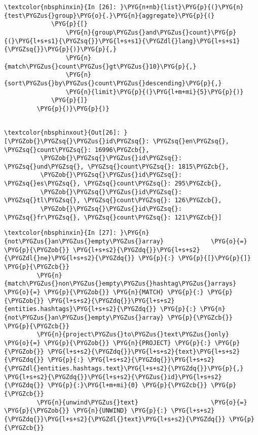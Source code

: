 \documentclass[letterpaper,10pt,english]{sphinxmanual}
\begin{document}
%
\begin{Verbatim}[commandchars=\\\{\}]
\textcolor{nbsphinxin}{In [26]: }\PYG{n+nb}{list}\PYG{p}{(}\PYG{n}{test\PYGZus{}group}\PYG{o}{.}\PYG{n}{aggregate}\PYG{p}{(}
             \PYG{p}{[}
                 \PYG{n}{group\PYGZus{}and\PYGZus{}count}\PYG{p}{(}\PYG{l+s+s1}{\PYGZsq{}}\PYG{l+s+s1}{\PYGZdl{}lang}\PYG{l+s+s1}{\PYGZsq{}}\PYG{p}{)}\PYG{p}{,}
                 \PYG{n}{match\PYGZus{}count\PYGZus{}gt\PYGZus{}10}\PYG{p}{,}
                 \PYG{n}{sort\PYGZus{}by\PYGZus{}count\PYGZus{}descending}\PYG{p}{,}
                 \PYG{n}{limit}\PYG{p}{(}\PYG{l+m+mi}{5}\PYG{p}{)}
             \PYG{p}{]}
         \PYG{p}{)}\PYG{p}{)}
         
\end{Verbatim}

%
\begin{Verbatim}[commandchars=\\\{\}]
\textcolor{nbsphinxout}{Out[26]: }[\PYGZob{}\PYGZsq{}\PYGZus{}id\PYGZsq{}: \PYGZsq{}en\PYGZsq{}, \PYGZsq{}count\PYGZsq{}: 16996\PYGZcb{},
          \PYGZob{}\PYGZsq{}\PYGZus{}id\PYGZsq{}: \PYGZsq{}und\PYGZsq{}, \PYGZsq{}count\PYGZsq{}: 1815\PYGZcb{},
          \PYGZob{}\PYGZsq{}\PYGZus{}id\PYGZsq{}: \PYGZsq{}es\PYGZsq{}, \PYGZsq{}count\PYGZsq{}: 295\PYGZcb{},
          \PYGZob{}\PYGZsq{}\PYGZus{}id\PYGZsq{}: \PYGZsq{}tl\PYGZsq{}, \PYGZsq{}count\PYGZsq{}: 126\PYGZcb{},
          \PYGZob{}\PYGZsq{}\PYGZus{}id\PYGZsq{}: \PYGZsq{}fr\PYGZsq{}, \PYGZsq{}count\PYGZsq{}: 121\PYGZcb{}]
\end{Verbatim}

%
\begin{Verbatim}[commandchars=\\\{\}]
\textcolor{nbsphinxin}{In [27]: }\PYG{n}{not\PYGZus{}an\PYGZus{}empty\PYGZus{}array}             \PYG{o}{=} \PYG{p}{\PYGZob{}} \PYG{l+s+s2}{\PYGZdq{}}\PYG{l+s+s2}{\PYGZdl{}ne}\PYG{l+s+s2}{\PYGZdq{}} \PYG{p}{:} \PYG{p}{[}\PYG{p}{]} \PYG{p}{\PYGZcb{}}
         \PYG{n}{match\PYGZus{}non\PYGZus{}empty\PYGZus{}hashtag\PYGZus{}arrays} \PYG{o}{=} \PYG{p}{\PYGZob{}} \PYG{n}{MATCH} \PYG{p}{:} \PYG{p}{\PYGZob{}} \PYG{l+s+s2}{\PYGZdq{}}\PYG{l+s+s2}{entities.hashtags}\PYG{l+s+s2}{\PYGZdq{}} \PYG{p}{:} \PYG{n}{not\PYGZus{}an\PYGZus{}empty\PYGZus{}array} \PYG{p}{\PYGZcb{}} \PYG{p}{\PYGZcb{}}
         \PYG{n}{project\PYGZus{}to\PYGZus{}text\PYGZus{}only}           \PYG{o}{=} \PYG{p}{\PYGZob{}} \PYG{n}{PROJECT} \PYG{p}{:} \PYG{p}{\PYGZob{}} \PYG{l+s+s2}{\PYGZdq{}}\PYG{l+s+s2}{text}\PYG{l+s+s2}{\PYGZdq{}} \PYG{p}{:} \PYG{l+s+s2}{\PYGZdq{}}\PYG{l+s+s2}{\PYGZdl{}entities.hashtags.text}\PYG{l+s+s2}{\PYGZdq{}}\PYG{p}{,} \PYG{l+s+s2}{\PYGZdq{}}\PYG{l+s+s2}{\PYGZus{}id}\PYG{l+s+s2}{\PYGZdq{}} \PYG{p}{:}\PYG{l+m+mi}{0} \PYG{p}{\PYGZcb{}} \PYG{p}{\PYGZcb{}}
         \PYG{n}{unwind\PYGZus{}text}                    \PYG{o}{=} \PYG{p}{\PYGZob{}} \PYG{n}{UNWIND} \PYG{p}{:} \PYG{l+s+s2}{\PYGZdq{}}\PYG{l+s+s2}{\PYGZdl{}text}\PYG{l+s+s2}{\PYGZdq{}} \PYG{p}{\PYGZcb{}}
\end{Verbatim}
\end{document}
